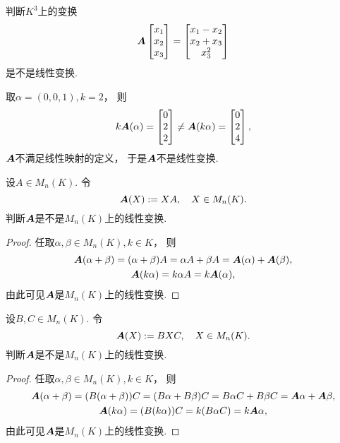 \begin{example}
判断\(K^3\)上的变换\[
	\boldsymbol{A}
	\begin{bmatrix}
		x_1 \\ x_2 \\ x_3
	\end{bmatrix}
	= \begin{bmatrix}
		x_1 - x_2 \\
		x_2 + x_3 \\
		x_3^2
	\end{bmatrix}
\]是不是线性变换.
\begin{solution}
取\(\alpha=(0,0,1),
k=2\)，
则\[
	k\boldsymbol{A}(\alpha)
	= \begin{bmatrix}
		0 \\ 2 \\ 2
	\end{bmatrix}
	\neq
	\boldsymbol{A}(k\alpha)
	= \begin{bmatrix}
		0 \\ 2 \\ 4
	\end{bmatrix},
\]
\(\boldsymbol{A}\)不满足线性映射的定义，
于是\(\boldsymbol{A}\)不是线性变换.
\end{solution}
\end{example}

\begin{example}
设\(A \in M_n(K)\).
令\[
	\boldsymbol{A}(X) := X A,
	\quad X \in M_n(K).
\]
判断\(\boldsymbol{A}\)是不是\(M_n(K)\)上的线性变换.
\begin{proof}
任取\(\alpha,\beta \in M_n(K),
k \in K\)，
则\begin{gather*}
	\boldsymbol{A}(\alpha + \beta)
	= (\alpha + \beta) A
	= \alpha A + \beta A
	= \boldsymbol{A}(\alpha) + \boldsymbol{A}(\beta), \\
	\boldsymbol{A}(k \alpha)
	= k \alpha A
	= k \boldsymbol{A}(\alpha),
\end{gather*}
由此可见\(\boldsymbol{A}\)是\(M_n(K)\)上的线性变换.
\end{proof}
\end{example}

\begin{example}
设\(B,C \in M_n(K)\).
令\[
	\boldsymbol{A}(X) := B X C,
	\quad X \in M_n(K).
\]
判断\(\boldsymbol{A}\)是不是\(M_n(K)\)上的线性变换.
\begin{proof}
任取\(\alpha,\beta \in M_n(K),
k \in K\)，
则\begin{gather*}
	\boldsymbol{A}(\alpha+\beta)
	= (B(\alpha+\beta))C
	= (B\alpha+B\beta)C
	= B \alpha C + B \beta C
	= \boldsymbol{A}\alpha + \boldsymbol{A}\beta, \\
	\boldsymbol{A}(k \alpha)
	= (B(k\alpha))C
	= k (B \alpha C)
	= k \boldsymbol{A}\alpha,
\end{gather*}
由此可见\(\boldsymbol{A}\)是\(M_n(K)\)上的线性变换.
\end{proof}
\end{example}

